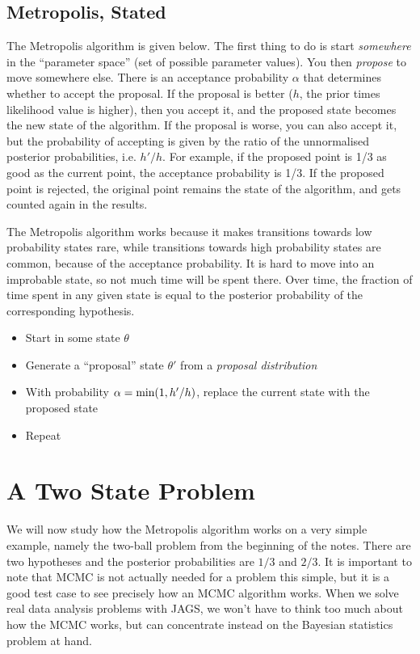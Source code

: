 \subsection{Metropolis, Stated}
The Metropolis algorithm is given below. The first thing to do is start
{\it somewhere} in the ``parameter space'' (set of possible parameter values).
You then
{\it propose} to move somewhere else. There is an acceptance probability $\alpha$
that determines whether to accept the proposal. If the proposal is better
($h$, the prior times likelihood value is higher), then you accept it, and the
proposed state becomes the new state of the algorithm.
If the
proposal is worse, you can also accept it, but the probability of accepting is
given by the ratio of the unnormalised posterior probabilities, i.e. $h'/h$.
For example, if the proposed point is 1/3 as good as the current point, the
acceptance probability is 1/3. If the proposed point is rejected, the original
point remains the state of the algorithm, and gets counted again in the results.

The Metropolis algorithm works because it makes transitions towards low
probability
states rare, while transitions towards high probability states are common, because
of the acceptance probability. It is hard to move into an improbable state, so
not much time will be spent there. Over time, the fraction of time spent in
any given state is equal to the posterior probability of the corresponding
hypothesis.

\begin{framed}
\begin{itemize}
\item Start in some state $\theta$
\item Generate a ``proposal'' state $\theta'$ from a {\it proposal distribution}
\item With probability $\alpha = \textnormal{min}(1, h'/h)$, replace the current
state with the proposed state
\item Repeat
\end{itemize}
\end{framed}

\section{A Two State Problem}
We will now study how the Metropolis algorithm works on a very simple
example, namely the two-ball problem from the beginning of the notes. There
are two hypotheses and the posterior probabilities are $1/3$ and $2/3$.
It is important to note that MCMC is not actually needed for a problem this
simple, but it is a good test case to see precisely how an MCMC algorithm works.
When we solve real data analysis problems with JAGS,
we won't have to think too
much about how the MCMC works, but can concentrate instead on the Bayesian
statistics problem at hand.

